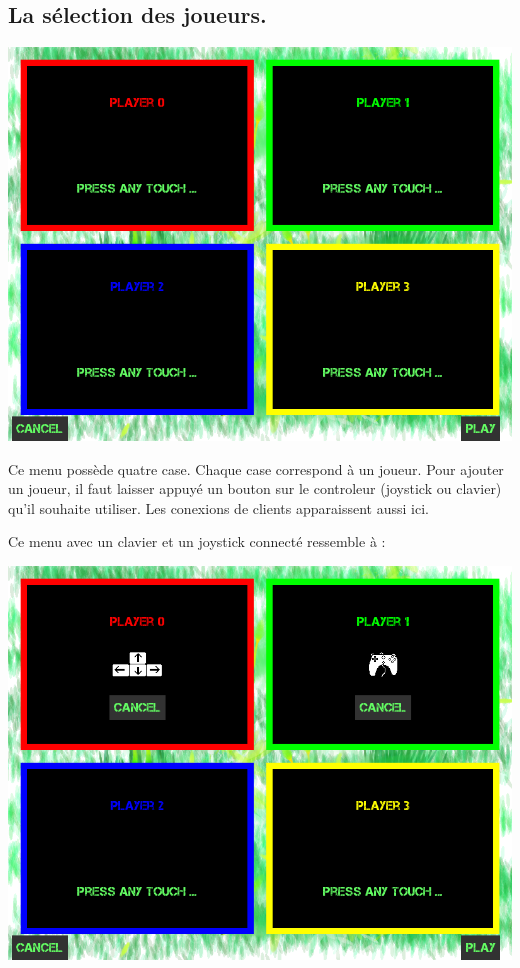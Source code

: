 \documentclass{article}
\begin{document}
\subsection{La sélection des joueurs.} \label{select}
\begin{center}
	\includegraphics[scale=0.4]{img/empty.png}
\end{center}
Ce menu possède quatre case. Chaque case correspond à un joueur. Pour ajouter un joueur, il faut laisser appuyé un bouton sur le controleur (joystick ou clavier) qu'il souhaite utiliser. Les conexions de clients apparaissent aussi ici.

Ce menu avec un clavier et un joystick connecté ressemble à :
\begin{center}
	\includegraphics[scale=0.4]{img/full.png}
\end{center}
\end{document}
